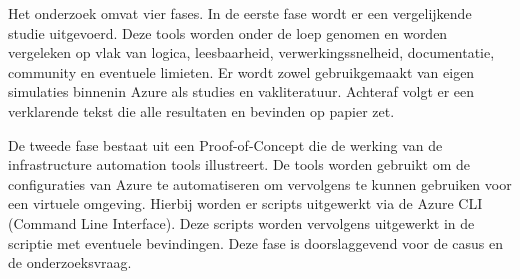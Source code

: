 \begin{comment}

Hier beschrijf je hoe je van plan bent het onderzoek te voeren. Welke onderzoekstechniek ga je toepassen om elk van je onderzoeksvragen te beantwoorden? Gebruik je hiervoor literatuurstudie, interviews met belanghebbenden (bv.~voor requirements-analyse), experimenten, simulaties, vergelijkende studie, risico-analyse, PoC, \ldots?

Valt je onderwerp onder één van de typische soorten bachelorproeven die besproken zijn in de lessen Research Methods (bv.\ vergelijkende studie of risico-analyse)? Zorg er dan ook voor dat we duidelijk de verschillende stappen terug vinden die we verwachten in dit soort onderzoek!

Vermijd onderzoekstechnieken die geen objectieve, meetbare resultaten kunnen opleveren. Enquêtes, bijvoorbeeld, zijn voor een bachelorproef informatica meestal \textbf{niet geschikt}. De antwoorden zijn eerder meningen dan feiten en in de praktijk blijkt het ook bijzonder moeilijk om voldoende respondenten te vinden. Studenten die een enquête willen voeren, hebben meestal ook geen goede definitie van de populatie, waardoor ook niet kan aangetoond worden dat eventuele resultaten representatief zijn.

Uit dit onderdeel moet duidelijk naar voor komen dat je bachelorproef ook technisch voldoen\-de diepgang zal bevatten. Het zou niet kloppen als een bachelorproef informatica ook door bv.\ een student marketing zou kunnen uitgevoerd worden.

Je beschrijft ook al welke tools (hardware, software, diensten, \ldots) je denkt hiervoor te gebruiken of te ontwikkelen.

Probeer ook een tijdschatting te maken. Hoe lang zal je met elke fase van je onderzoek bezig zijn en wat zijn de concrete \emph{deliverables} in elke fase?

\end{comment}

Het onderzoek omvat vier fases. In de eerste fase wordt er een vergelijkende studie uitgevoerd. Deze tools worden onder de loep genomen en worden vergeleken op vlak van logica, leesbaarheid, verwerkingssnelheid, documentatie, community en eventuele limieten. Er wordt zowel gebruikgemaakt van eigen simulaties binnenin Azure als studies en vakliteratuur. Achteraf volgt er een verklarende tekst die alle resultaten en bevinden op papier zet. 

De tweede fase bestaat uit een Proof-of-Concept die de werking van de infrastructure automation tools illustreert. De tools worden gebruikt om de configuraties van Azure te automatiseren om vervolgens te kunnen gebruiken voor een virtuele omgeving. Hierbij worden er scripts uitgewerkt via de Azure CLI (Command Line Interface). Deze scripts worden vervolgens uitgewerkt in de scriptie met eventuele bevindingen. Deze fase is doorslaggevend voor de casus en de onderzoeksvraag.

